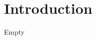 \documentclass[\main/dresen_thesis.tex]{subfiles}
\begin{document}
\chapter{Introduction}\label{ch:introduction}

Empty
\end{document}
